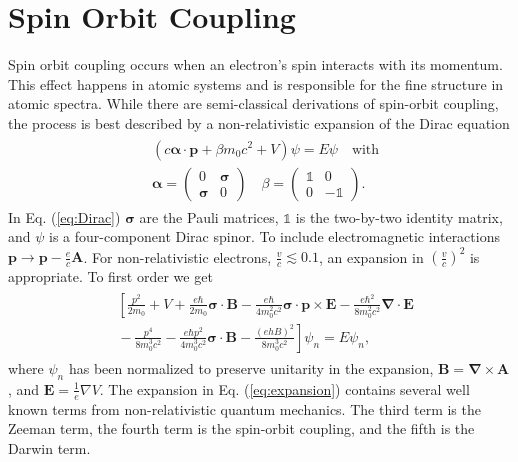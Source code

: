 \documentclass[12pt]{article}
\newcommand{\newln}{\\&{}}
\begin{document}
\section{Spin Orbit Coupling}
Spin orbit coupling occurs when an electron's spin interacts with its momentum.
This effect happens in atomic systems and is responsible for the fine structure in atomic spectra.
While there are semi-classical derivations of spin-orbit coupling, the process is best described by a non-relativistic expansion of the Dirac equation \cite{Dirac, Winkler}
\begin{align}\begin{split}
  \label{eq:Dirac}
  & (c\boldsymbol{\alpha\cdot p}+\beta m_{0}c^2+V)\psi=E\psi \quad\text{with}\newln\boldsymbol{\alpha}=\left(\begin{array}{cc} 0 & \boldsymbol{\sigma} \\ \boldsymbol{\sigma} & 0 \end{array} \right) \quad \beta=\left(\begin{array}{cc} \mathbb{1} & 0 \\ 0 & -\mathbb{1} \end{array} \right)\text{.}
\end{split}\end{align}
In Eq. (\ref{eq:Dirac}) $\boldsymbol\sigma$ are the Pauli matrices, $\mathbb{1}$ is the two-by-two identity matrix, and $\psi$ is a four-component Dirac spinor.
To include electromagnetic interactions $\boldsymbol{p}\rightarrow\boldsymbol{p}-\frac{e}{c}\boldsymbol{A}$.
For non-relativistic electrons, $\frac{v}{c}\lesssim 0.1$, an expansion in $(\frac{v}{c})^2$ is appropriate.
To first order we get
\begin{align}\begin{split}
  \label{eq:expansion}
& \left [ \frac{p^2}{2m_0}\right.+V+\frac{e\hbar}{2m_0}\boldsymbol{\sigma\cdot B}-\frac{e\hbar}{4m_0^2c^2}\boldsymbol{\sigma\cdot p \times E}-\frac{e\hbar^2}{8m_0^2c^2}\boldsymbol{\nabla\cdot E} \newln-\frac{p^4}{8m_0^3c^2}-\frac{e\hbar p^2}{4m_0^3c^2}\boldsymbol{\sigma \cdot B}-\left.\frac{(ehB)^2}{8m_0^3c^2}\right]\psi_n=E\psi_n\text{,}
\end{split}\end{align}
where $\psi_n$ has been normalized to preserve unitarity in the expansion, $\boldsymbol{B}=\boldsymbol{\nabla}\times\boldsymbol{A}$, and $\boldsymbol{E}=\frac{1}{e}\nabla V$.
The expansion in Eq. (\ref{eq:expansion}) contains several well known terms from non-relativistic quantum mechanics.
The third term is the Zeeman term, the fourth term is the spin-orbit coupling, and the fifth is the Darwin term.
\end{document}
